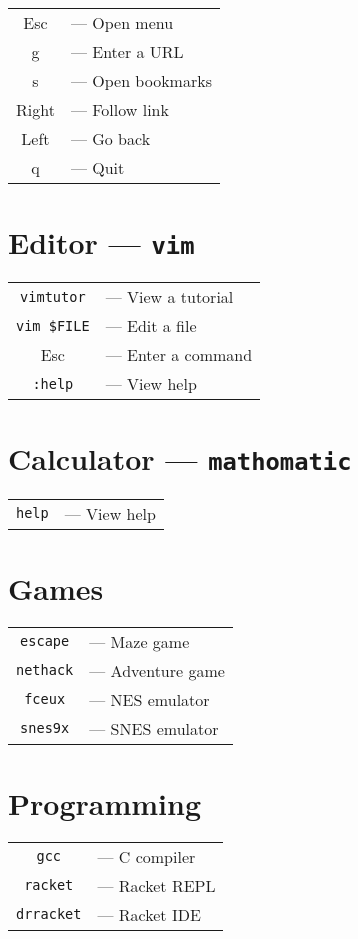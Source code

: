 \documentclass[11pt,twocolumn]{article}
\begin{document}
\begin{tabular}{cl}
  Esc & --- Open menu \\
  g & --- Enter a URL \\
  s & --- Open bookmarks \\
  Right & --- Follow link \\
  Left & --- Go back \\
  q & --- Quit
\end{tabular}

\section*{Editor --- \texttt{vim}}

\begin{tabular}{cl}
  \texttt{vimtutor} & --- View a tutorial \\
  \texttt{vim \$FILE} & --- Edit a file \\
  Esc & --- Enter a command \\
  \texttt{:help} & --- View help
\end{tabular}

\section*{Calculator --- \texttt{mathomatic}}

\begin{tabular}{cl}
  \texttt{help} & --- View help
\end{tabular}

\section*{Games}

\begin{tabular}{cl}
  \texttt{escape} & --- Maze game \\
  \texttt{nethack} & --- Adventure game \\
  \texttt{fceux} & --- NES emulator \\
  \texttt{snes9x} & --- SNES emulator
\end{tabular}

\section*{Programming}

\begin{tabular}{cl}
  \texttt{gcc} & --- C compiler \\
  \texttt{racket} & --- Racket REPL \\
  \texttt{drracket} & --- Racket IDE
\end{tabular}
\end{document}
